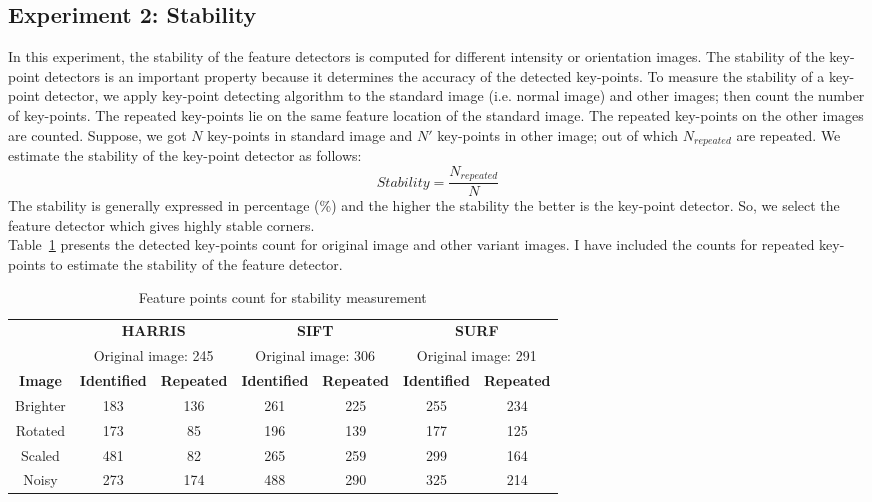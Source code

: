 \subsection{Experiment 2: Stability}
In this experiment, the stability of the feature detectors is computed for different intensity or orientation images. The stability of the key-point detectors is an important property because it determines the accuracy of the detected key-points. To measure the stability of a key-point detector, we apply key-point detecting algorithm to the standard image (i.e. normal image) and other images; then count the number of key-points. The repeated key-points lie on the same feature location of the standard image. The repeated key-points on the other images are counted. Suppose, we got $N$ key-points in standard image and $N'$ key-points in other image; out of which $N_{repeated}$ are repeated. We estimate the stability of the key-point detector as follows:
\begin{equation}
Stability=\frac{N_{repeated}}{N}
\label{eq:stability}
\end{equation}
The stability is generally expressed in percentage (\%) and the higher the stability the better is the key-point detector. So, we select the feature detector which gives highly stable corners.\\ 

\noindent Table~\ref{table:corners-count} presents the detected key-points count for original image and other variant images. I have included the counts for repeated key-points to estimate the stability of the feature detector.
\begin{table}[H]%
\centering
\begin{tabular}{l|c|c|c|c|c|c|}
\cline{2-7}
&\multicolumn{2}{|c|}{\textbf{HARRIS}} & \multicolumn{2}{|c|}{\textbf{SIFT}} & \multicolumn{2}{|c|}{\textbf{SURF}} \\ \cline{2-7}
& \multicolumn{2}{|c|}{Original image: 245} & \multicolumn{2}{|c|}{Original image: 306} & \multicolumn{2}{|c|}{Original image: 291} \\ \hline
\multicolumn{1}{|c|}{\textbf{Image}} & \textbf{Identified} & \textbf{Repeated} & \textbf{Identified} & \textbf{Repeated} & \textbf{Identified} & \textbf{Repeated} \\ \hline
\multicolumn{1}{|c|}{Brighter} & 183 & 136 & 261 & 225&255 & 234\\ \hline
\multicolumn{1}{|c|}{Rotated} & 173 & 85 & 196 & 139& 177 &125\\ \hline
\multicolumn{1}{|c|}{Scaled} & 481 & 82 &265 & 259& 299 & 164 \\ \hline
\multicolumn{1}{|c|}{Noisy} & 273 & 174 & 488 & 290 & 325 & 214 \\ \hline
\end{tabular}
\caption[Feature Points Count]{Feature points count for stability measurement}
\label{table:corners-count}
\end{table} 

